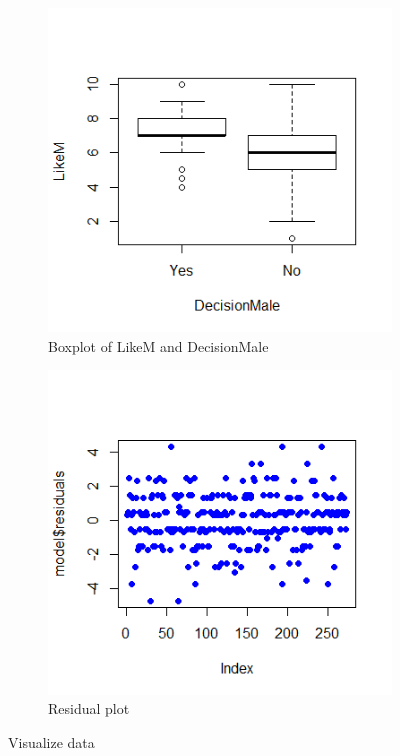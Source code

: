 \documentclass[a4paper,12pt]{article}
\begin{document}
	\begin{figure}[H]
		\centering
		\begin{subfigure}[b]{0.7\linewidth}
			\includegraphics[width=\linewidth]{boxplot.png}
			\caption{Boxplot of LikeM and DecisionMale}
			\label{fig:boxplot}
		\end{subfigure}
		
		\begin{subfigure}[b]{0.7\linewidth}
			\includegraphics[width=\linewidth]{residual_plot.png}
			\caption{Residual plot}
			\label{fig:resiplot}
		\end{subfigure}
		\caption{Visualize data}
	\end{figure}
	
\end{document}
